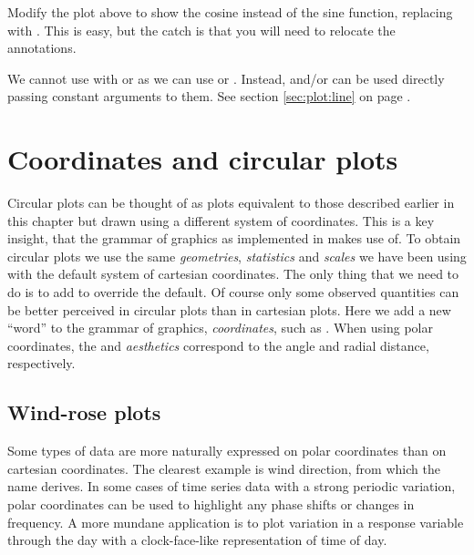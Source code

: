 \documentclass[krantz2]{krantz}\usepackage{knitr}
\begin{document}
\begin{playground}
Modify the plot above to show the cosine instead of the sine function, replacing  with . This is easy, but the catch is that you will need to relocate the annotations.
\end{playground}

\begin{warningbox}
We cannot use  with  or  as we can use  or . Instead,  and/or   can be used directly passing constant arguments to them. See section \ref{sec:plot:line} on page \pageref{sec:plot:vhline}.
\end{warningbox}

\section{Coordinates and circular plots}\label{sec:plot:circular}\label{sec:plot:coord}
Circular plots can be thought of as plots equivalent to those described earlier in this chapter but drawn using a different system of coordinates. This is a key insight, that the grammar of graphics as implemented in \ggplot makes use of. To obtain circular plots we use the same \emph{geometries}, \emph{statistics} and \emph{scales} we have been using with the default system of cartesian coordinates. The only thing that we need to do is to add  to override the default. Of course only some observed quantities can be better perceived in circular plots than in cartesian plots. Here we add a new ``word'' to the grammar of graphics, \textit{coordinates}, such as .
When using polar coordinates, the  and  \textit{aesthetics} correspond to the angle and radial distance, respectively.

\subsection{Wind-rose plots}
Some types of data are more naturally expressed on polar coordinates than on cartesian coordinates. The clearest example is wind direction, from which the name derives. In some cases of time series data with a strong periodic variation, polar coordinates can be used to highlight any phase shifts or changes in frequency. A more mundane application is to plot variation in a response variable through the day with a clock-face-like representation of time of day.
\end{document}
